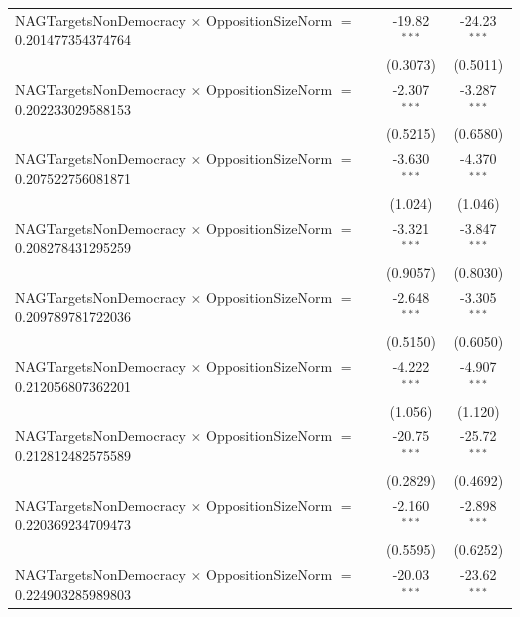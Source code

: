 \begin{tabular}{lcc}
   NAGTargetsNonDemocracy $\times$ OppositionSizeNorm $=$ 0.201477354374764     & -19.82$^{***}$       & -24.23$^{***}$\\   
                                                                                & (0.3073)             & (0.5011)\\   
   NAGTargetsNonDemocracy $\times$ OppositionSizeNorm $=$ 0.202233029588153     & -2.307$^{***}$       & -3.287$^{***}$\\   
                                                                                & (0.5215)             & (0.6580)\\   
   NAGTargetsNonDemocracy $\times$ OppositionSizeNorm $=$ 0.207522756081871     & -3.630$^{***}$       & -4.370$^{***}$\\   
                                                                                & (1.024)              & (1.046)\\   
   NAGTargetsNonDemocracy $\times$ OppositionSizeNorm $=$ 0.208278431295259     & -3.321$^{***}$       & -3.847$^{***}$\\   
                                                                                & (0.9057)             & (0.8030)\\   
   NAGTargetsNonDemocracy $\times$ OppositionSizeNorm $=$ 0.209789781722036     & -2.648$^{***}$       & -3.305$^{***}$\\   
                                                                                & (0.5150)             & (0.6050)\\   
   NAGTargetsNonDemocracy $\times$ OppositionSizeNorm $=$ 0.212056807362201     & -4.222$^{***}$       & -4.907$^{***}$\\   
                                                                                & (1.056)              & (1.120)\\   
   NAGTargetsNonDemocracy $\times$ OppositionSizeNorm $=$ 0.212812482575589     & -20.75$^{***}$       & -25.72$^{***}$\\   
                                                                                & (0.2829)             & (0.4692)\\   
   NAGTargetsNonDemocracy $\times$ OppositionSizeNorm $=$ 0.220369234709473     & -2.160$^{***}$       & -2.898$^{***}$\\   
                                                                                & (0.5595)             & (0.6252)\\   
   NAGTargetsNonDemocracy $\times$ OppositionSizeNorm $=$ 0.224903285989803     & -20.03$^{***}$       & -23.62$^{***}$\\   

\end{tabular}
